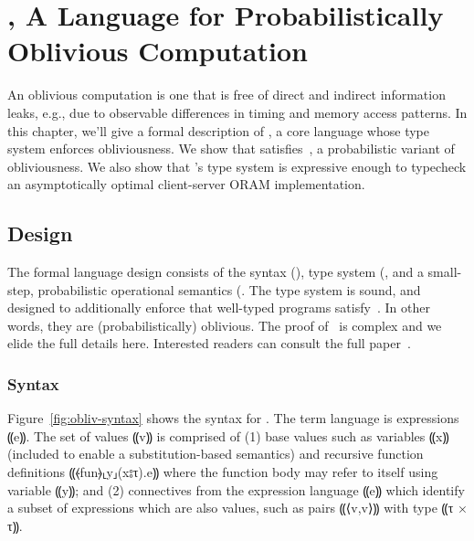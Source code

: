 \chapter{\obliv, A Language for Probabilistically Oblivious Computation}
\label{ch:obliv}

An oblivious computation is one that is free of direct and indirect information leaks, e.g., due to observable differences
in timing and memory access patterns. In this chapter, we'll give a formal description of \obliv, a core language whose
type system enforces obliviousness. We show that \obliv satisfies~, a probabilistic variant of obliviousness.
We also show that \obliv's type system is expressive enough to typecheck an asymptotically optimal client-server ORAM implementation.

\section{Design}
\label{sec:obliv-design}

The formal language design consists of the syntax (), type system (,
and a small-step, probabilistic operational semantics (. The type system is sound, and designed to additionally
enforce that well-typed programs satisfy~. In other words, they are (probabilistically) oblivious.
The proof of~ is complex and we elide the full details here. Interested readers can consult the full paper~\cite{}.


\subsection{Syntax}
\label{subsec:obliv-design-syntax}

Figure~\ref{fig:obliv-syntax} shows the syntax for \obliv. The term language is
expressions ⸨e⸩. The set of values ⸨v⸩ is comprised of (1) base values such as
variables ⸨x⸩ (included to enable a substitution-based semantics) and recursive function
definitions ⸨⦑fun⦒⸤y⸥(x{⦂}τ).e⸩ where the function body may refer to itself
using variable ⸨y⸩; and (2) connectives from the expression language ⸨e⸩ which
identify a subset of expressions which are also values, such as pairs ⸨⟨v,v⟩⸩
with type ⸨τ × τ⸩.

